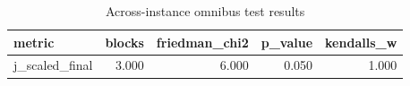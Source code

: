 \begin{table}[!t]
\centering
\caption{Across-instance omnibus test results}
\label{tab:friedman_omnibus_generated}
\begin{tabular}{lrrrr}
\toprule
metric & blocks & friedman_chi2 & p_value & kendalls_w \\
\midrule
j_scaled_final & 3.000 & 6.000 & 0.050 & 1.000 \\
\bottomrule
\end{tabular}

\end{table}